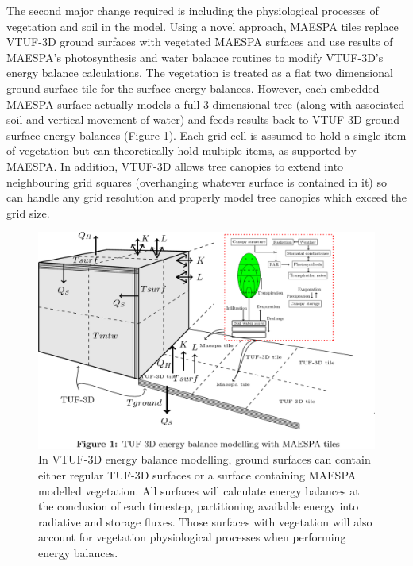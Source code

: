 \documentclass[final,3p,times,authoryear]{elsarticle}
\begin{document}
The second major change required is including the physiological processes of vegetation and soil in the model. Using a novel approach, MAESPA tiles replace VTUF-3D ground surfaces with vegetated MAESPA surfaces and use results of MAESPA's photosynthesis and water balance routines to modify VTUF-3D's energy balance calculations. The vegetation is treated as a flat two dimensional ground surface tile for the surface energy balances. However, each embedded MAESPA surface actually models a full 3 dimensional tree (along with associated soil and vertical movement of water) and feeds results back to VTUF-3D ground surface energy balances (Figure \ref{fig:TUFWithMaespaInsert}). Each grid cell is assumed to hold a single item of vegetation but can theoretically hold multiple items, as supported by MAESPA. In addition, VTUF-3D allows tree canopies to extend into neighbouring grid squares (overhanging whatever surface is contained in it) so can handle any grid resolution and properly model tree canopies which exceed the grid size.  

\begin{figure}[!htbp]
 \includegraphics[trim = 0mm 14mm 22mm 0.0mm, clip, scale=0.25]{images/TUFWithMaespaInsert.png}
 \caption{\label{fig:TUFWithMaespaInsert} In VTUF-3D energy balance modelling, ground surfaces can contain either regular TUF-3D surfaces or a surface containing MAESPA modelled vegetation. All surfaces will calculate energy balances at the conclusion of each timestep, partitioning available energy into radiative and storage fluxes. Those surfaces with vegetation will also account for vegetation physiological processes when performing energy balances.}
\end{figure}
\end{document}
